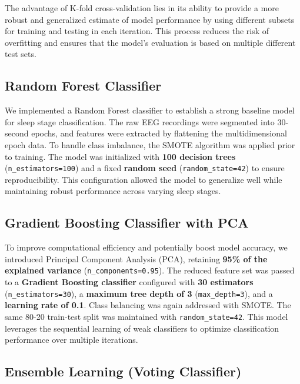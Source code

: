 The advantage of K-fold cross-validation lies in its ability to provide a more robust and generalized estimate of model performance by using different subsets for training and testing in each iteration. This process reduces the risk of overfitting and ensures that the model's evaluation is based on multiple different test sets.








\subsection{Random Forest Classifier}

We implemented a Random Forest classifier to establish a strong baseline model for sleep stage classification. The raw EEG recordings were segmented into 30-second epochs, and features were extracted by flattening the multidimensional epoch data. To handle class imbalance, the SMOTE algorithm was applied prior to training. The model was initialized with \textbf{100 decision trees} (\texttt{n\_estimators=100}) and a fixed \textbf{random seed} (\texttt{random\_state=42}) to ensure reproducibility. This configuration allowed the model to generalize well while maintaining robust performance across varying sleep stages.

\subsection{Gradient Boosting Classifier with PCA}

To improve computational efficiency and potentially boost model accuracy, we introduced Principal Component Analysis (PCA), retaining \textbf{95\% of the explained variance} (\texttt{n\_components=0.95}). The reduced feature set was passed to a \textbf{Gradient Boosting classifier} configured with \textbf{30 estimators} (\texttt{n\_estimators=30}), a \textbf{maximum tree depth of 3} (\texttt{max\_depth=3}), and a \textbf{learning rate of 0.1}. Class balancing was again addressed with SMOTE. The same 80-20 train-test split was maintained with \texttt{random\_state=42}. This model leverages the sequential learning of weak classifiers to optimize classification performance over multiple iterations.

\subsection{Ensemble Learning (Voting Classifier)}

